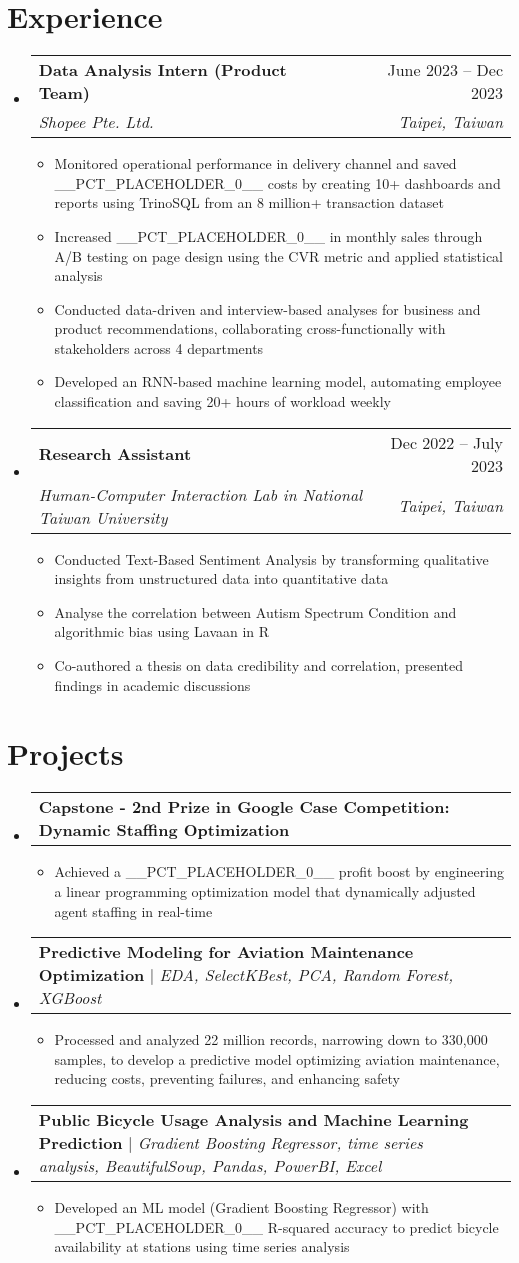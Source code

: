 \documentclass[letterpaper,11pt]{article}
\makeatletter
\newcommand{\resumeItem}[1]{
  \item\small{
    {#1 \vspace{-2pt}}
  }
}
\newcommand{\resumeSubheading}[4]{
  \vspace{-2pt}\item
    \begin{tabular*}{0.97\textwidth}[t]{l@{\extracolsep{\fill}}r}
      \textbf{#1} & #2 \\
      \textit{\small#3} & \textit{\small #4} \\
    \end{tabular*}\vspace{-7pt}
}
\newcommand{\resumeProjectHeading}[2]{
    \item
    \begin{tabular*}{0.97\textwidth}{l@{\extracolsep{\fill}}r}
      \small#1 & #2 \\
    \end{tabular*}\vspace{-7pt}
}
\newcommand{\resumeSubHeadingListStart}{\begin{itemize}[leftmargin=0.15in, label={}]}
\newcommand{\resumeSubHeadingListEnd}{\end{itemize}}
\newcommand{\resumeItemListStart}{\begin{itemize}}
\newcommand{\resumeItemListEnd}{\end{itemize}\vspace{-5pt}}
\makeatother
\begin{document}
\section{Experience}
  \resumeSubHeadingListStart
    \resumeSubheading
      {Data Analysis Intern (Product Team)}{June 2023 -- Dec 2023}
      {Shopee Pte. Ltd.}{Taipei, Taiwan}
      \resumeItemListStart
        \resumeItem{Monitored operational performance in delivery channel and saved \_\_PCT\_PLACEHOLDER\_0\_\_ costs by creating 10+ dashboards and reports using TrinoSQL from an 8 million+ transaction dataset}
        \resumeItem{Increased \_\_PCT\_PLACEHOLDER\_0\_\_ in monthly sales through A/B testing on page design using the CVR metric and applied statistical analysis}
        \resumeItem{Conducted data-driven and interview-based analyses for business and product recommendations, collaborating cross-functionally with stakeholders across 4 departments}
        \resumeItem{Developed an RNN-based machine learning model, automating employee classification and saving 20+ hours of workload weekly}
      \resumeItemListEnd
    \resumeSubheading
      {Research Assistant}{Dec 2022 -- July 2023}
      {Human-Computer Interaction Lab in National Taiwan University}{Taipei, Taiwan}
      \resumeItemListStart
        \resumeItem{Conducted Text-Based Sentiment Analysis by transforming qualitative insights from unstructured data into quantitative data}
        \resumeItem{Analyse the correlation between Autism Spectrum Condition and algorithmic bias using Lavaan in R}
        \resumeItem{Co-authored a thesis on data credibility and correlation, presented findings in academic discussions}
      \resumeItemListEnd
  \resumeSubHeadingListEnd

\section{Projects}
    \resumeSubHeadingListStart
      \resumeProjectHeading
          {\textbf{Capstone - 2nd Prize in Google Case Competition: Dynamic Staffing Optimization}}{}
          \resumeItemListStart
            \resumeItem{Achieved a \_\_PCT\_PLACEHOLDER\_0\_\_ profit boost by engineering a linear programming optimization model that dynamically adjusted agent staffing in real-time}
          \resumeItemListEnd
      \resumeProjectHeading
          {\textbf{Predictive Modeling for Aviation Maintenance Optimization} $|$ \emph{EDA, SelectKBest, PCA, Random Forest, XGBoost}}{}
          \resumeItemListStart
            \resumeItem{Processed and analyzed 22 million records, narrowing down to 330,000 samples, to develop a predictive model optimizing aviation maintenance, reducing costs, preventing failures, and enhancing safety}
          \resumeItemListEnd
      \resumeProjectHeading
          {\textbf{Public Bicycle Usage Analysis and Machine Learning Prediction} $|$ \emph{Gradient Boosting Regressor, time series analysis, BeautifulSoup, Pandas, PowerBI, Excel}}{}
          \resumeItemListStart
            \resumeItem{Developed an ML model (Gradient Boosting Regressor) with \_\_PCT\_PLACEHOLDER\_0\_\_ R-squared accuracy to predict bicycle availability at stations using time series analysis}
          \resumeItemListEnd
    \resumeSubHeadingListEnd
\end{document}
